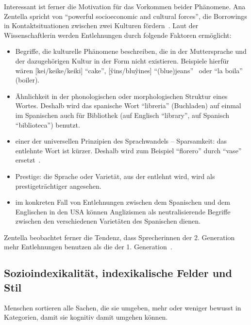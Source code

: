 Interessant ist ferner die Motivation für das Vorkommen beider Phänomene.
Ana Zentella spricht von ``powerful socioeconomic and cultural forces'', die Borrowings in Kontaktsituationen zwischen zwei Kulturen fördern~\cite{Zentella90}. %
Laut der Wissenschaftlerin werden Entlehnungen durch folgende Faktoren ermöglicht:
\begin{itemize}
  \item Begriffe, die kulturelle Phänomene beschreiben, die in der Muttersprache und der dazugehörigen Kultur in der Form nicht existieren. Beispiele hierfür wären [kei/keike/keiki] ``cake'', [\^yins/blu\^yines] ``(blue)jeans''~\cite{Zentella90} oder ``la boila'' (boiler). %
  \item Ähnlichkeit in der phonologischen oder morphologischen Struktur eines Wortes.
    Deshalb wird das spanische Wort ``libreria'' (Buchladen) auf einmal im Spanischen auch für Bibliothek (auf Englisch ``library'', auf Spanisch ``biblioteca'') benutzt. %
  \item einer der universellen Prinzipien des Sprachwandels -- Sparsamkeit: das entlehnte Wort ist kürzer. Deshalb wird zum Beispiel ``florero'' durch ``vase'' ersetzt~\cite{Zentella90}.%
  \item Prestige: die Sprache oder Varietät, aus der entlehnt wird, wird als prestigeträchtiger angesehen.
  \item im konkreten Fall von Entlehnungen zwischen dem Spanischen und dem Englischen in den USA können Anglizismen als neutralisierende Begriffe zwischen den verschiedenen Varietäten des Spanischen dienen.
\end{itemize}

Zentella beobachtet ferner die Tendenz, dass Sprecherinnen der 2. Generation mehr Entlehnungen benutzen als die der 1. Generation~\cite{Zentella90}.%


\subsection{Sozioindexikalität, indexikalische Felder und Stil}
\label{chap:sozioindexicality}

Menschen sortieren alle Sachen, die sie umgeben, mehr oder weniger bewusst in Kategorien, damit sie kognitiv damit umgehen können.

